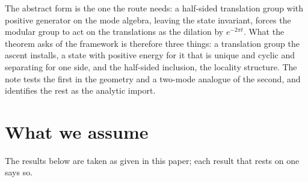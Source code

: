 \documentclass[11pt]{article}
\theoremstyle{definition}
\theoremstyle{plain}
\begin{document}
\label{c:note.angle.setting-setting-what-imported-2}
The abstract form is the one the route needs: a half-sided translation group with positive generator on the mode algebra, leaving the state invariant, forces the modular group to act on the translations as the dilation by $e^{-2\pi t}$. What the theorem asks of the framework is therefore three things: a translation group the ascent installs, a state with positive energy for it that is unique and cyclic and separating for one side, and the half-sided inclusion, the locality structure. The note tests the first in the geometry and a two-mode analogue of the second, and identifies the rest as the analytic import.

\section*{What we assume}
The results below are taken as given in this paper; each result that rests on one says so.
\end{document}
